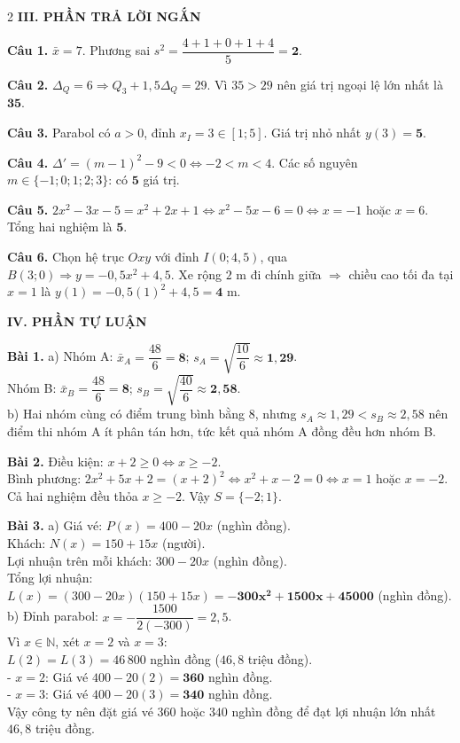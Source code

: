 \documentclass[12pt,a4paper]{article}
\begin{document}
\begin{multicols}{2}
\vspace{3pt}
\textbf{\color{accent}III. PHẦN TRẢ LỜI NGẮN}

\textbf{Câu 1.} $\bar{x} = 7$. Phương sai $s^2 = \dfrac{4 + 1 + 0 + 1 + 4}{5} = \mathbf{2}$.

\textbf{Câu 2.} $\Delta_Q = 6 \Rightarrow Q_3 + 1{,}5\Delta_Q = 29$. Vì $35 > 29$ nên giá trị ngoại lệ lớn nhất là $\mathbf{35}$.

\textbf{Câu 3.} Parabol có $a > 0$, đỉnh $x_I = 3 \in [1; 5]$. Giá trị nhỏ nhất $y(3) = \mathbf{5}$.

\textbf{Câu 4.} $\Delta' = (m - 1)^2 - 9 < 0 \Leftrightarrow -2 < m < 4$. Các số nguyên $m \in \{-1; 0; 1; 2; 3\}$: có $\mathbf{5}$ giá trị.

\textbf{Câu 5.} $2x^2 - 3x - 5 = x^2 + 2x + 1 \Leftrightarrow x^2 - 5x - 6 = 0 \Leftrightarrow x = -1$ hoặc $x = 6$. Tổng hai nghiệm là $\mathbf{5}$.

\textbf{Câu 6.} Chọn hệ trục $Oxy$ với đỉnh $I(0; 4{,}5)$, qua $B(3; 0) \Rightarrow y = -0{,}5x^2 + 4{,}5$. Xe rộng $2\text{ m}$ đi chính giữa $\Rightarrow$ chiều cao tối đa tại $x = 1$ là $y(1) = -0{,}5(1)^2 + 4{,}5 = \mathbf{4}\text{ m}$.

\vspace{4pt}
\textbf{\color{accent}IV. PHẦN TỰ LUẬN}

\textbf{Bài 1.}
a) Nhóm A: $\bar{x}_A = \dfrac{48}{6} = \mathbf{8}$; $s_A = \sqrt{\dfrac{10}{6}} \approx \mathbf{1{,}29}$.\\
Nhóm B: $\bar{x}_B = \dfrac{48}{6} = \mathbf{8}$; $s_B = \sqrt{\dfrac{40}{6}} \approx \mathbf{2{,}58}$.\\
b) Hai nhóm cùng có điểm trung bình bằng $8$, nhưng $s_A \approx 1{,}29 < s_B \approx 2{,}58$ nên điểm thi nhóm A ít phân tán hơn, tức kết quả nhóm A đồng đều hơn nhóm B.

\textbf{Bài 2.}
Điều kiện: $x + 2 \ge 0 \Leftrightarrow x \ge -2$.\\
Bình phương: $2x^2 + 5x + 2 = (x + 2)^2 \Leftrightarrow x^2 + x - 2 = 0 \Leftrightarrow x = 1$ hoặc $x = -2$.\\
Cả hai nghiệm đều thỏa $x \ge -2$. Vậy $S = \{-2; 1\}$.

\textbf{Bài 3.}
a) Giá vé: $P(x) = 400 - 20x$ (nghìn đồng).\\
Khách: $N(x) = 150 + 15x$ (người).\\
Lợi nhuận trên mỗi khách: $300 - 20x$ (nghìn đồng).\\
Tổng lợi nhuận: $L(x) = (300 - 20x)(150 + 15x) = \mathbf{-300x^2 + 1500x + 45000}$ (nghìn đồng).\\
b) Đỉnh parabol: $x = -\dfrac{1500}{2(-300)} = 2{,}5$.\\
Vì $x \in \mathbb{N}$, xét $x = 2$ và $x = 3$:\\
$L(2) = L(3) = 46\,800$ nghìn đồng ($46{,}8$ triệu đồng).\\
- $x = 2$: Giá vé $400 - 20(2) = \mathbf{360}$ nghìn đồng.\\
- $x = 3$: Giá vé $400 - 20(3) = \mathbf{340}$ nghìn đồng.\\
Vậy công ty nên đặt giá vé $360$ hoặc $340$ nghìn đồng để đạt lợi nhuận lớn nhất $46{,}8$ triệu đồng.

\end{multicols}
\end{document}
